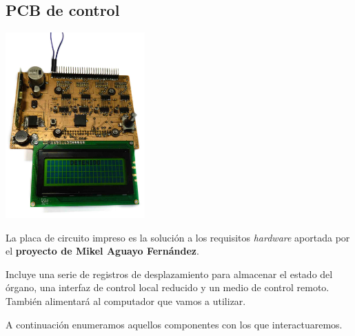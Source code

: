 \documentclass[10pt,a4paper]{article}
\begin{document}
	\subsection{PCB de control}
	
	\begin{multicols}{2}
		\noindent
		\begin{center}
			\includegraphics[width=0.4\textwidth]{images/pcb} 
		\end{center}
		\columnbreak
		La placa de circuito impreso es la solución a los requisitos \textit{hardware} aportada por el \textbf{proyecto de Mikel Aguayo Fernández}. 
		
		Incluye una serie de registros de desplazamiento para almacenar el estado del órgano, una interfaz de control local reducido y un medio de control remoto. También alimentará al computador que vamos a utilizar. 
		
		A continuación enumeramos aquellos componentes con los que interactuaremos.		 
	\end{multicols}	
	
\end{document}
